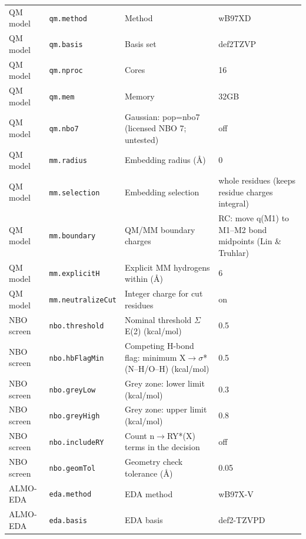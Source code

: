 {\begin{longtable}{llp{4.2cm}l}
QM model & \texttt{qm.method} & Method & \parbox[t]{5.0cm}{\raggedright wB97XD}\\
QM model & \texttt{qm.basis} & Basis set & \parbox[t]{5.0cm}{\raggedright def2TZVP}\\
QM model & \texttt{qm.nproc} & Cores & \parbox[t]{5.0cm}{\raggedright 16}\\
QM model & \texttt{qm.mem} & Memory & \parbox[t]{5.0cm}{\raggedright 32GB}\\
QM model & \texttt{qm.nbo7} & Gaussian: pop=nbo7 (licensed NBO 7; untested) & \parbox[t]{5.0cm}{\raggedright off}\\
QM model & \texttt{mm.radius} & Embedding radius (\AA{}) & \parbox[t]{5.0cm}{\raggedright 0}\\
QM model & \texttt{mm.selection} & Embedding selection & \parbox[t]{5.0cm}{\raggedright whole residues (keeps residue charges integral)}\\
QM model & \texttt{mm.boundary} & QM/MM boundary charges & \parbox[t]{5.0cm}{\raggedright RC: move q(M1) to M1--M2 bond midpoints (Lin \& Truhlar)}\\
QM model & \texttt{mm.explicitH} & Explicit MM hydrogens within (\AA{}) & \parbox[t]{5.0cm}{\raggedright 6}\\
QM model & \texttt{mm.neutralizeCut} & Integer charge for cut residues & \parbox[t]{5.0cm}{\raggedright on}\\
NBO screen & \texttt{nbo.threshold} & Nominal threshold $\Sigma$E(2) (kcal/mol) & \parbox[t]{5.0cm}{\raggedright 0.5}\\
NBO screen & \texttt{nbo.hbFlagMin} & Competing H-bond flag: minimum X$\to\sigma$*(N--H/O--H) (kcal/mol) & \parbox[t]{5.0cm}{\raggedright 0.5}\\
NBO screen & \texttt{nbo.greyLow} & Grey zone: lower limit (kcal/mol) & \parbox[t]{5.0cm}{\raggedright 0.3}\\
NBO screen & \texttt{nbo.greyHigh} & Grey zone: upper limit (kcal/mol) & \parbox[t]{5.0cm}{\raggedright 0.8}\\
NBO screen & \texttt{nbo.includeRY} & Count n$\to$RY*(X) terms in the decision & \parbox[t]{5.0cm}{\raggedright off}\\
NBO screen & \texttt{nbo.geomTol} & Geometry check tolerance (\AA{}) & \parbox[t]{5.0cm}{\raggedright 0.05}\\
ALMO-EDA & \texttt{eda.method} & EDA method & \parbox[t]{5.0cm}{\raggedright wB97X-V}\\
ALMO-EDA & \texttt{eda.basis} & EDA basis & \parbox[t]{5.0cm}{\raggedright def2-TZVPD}\\

\end{longtable}}

